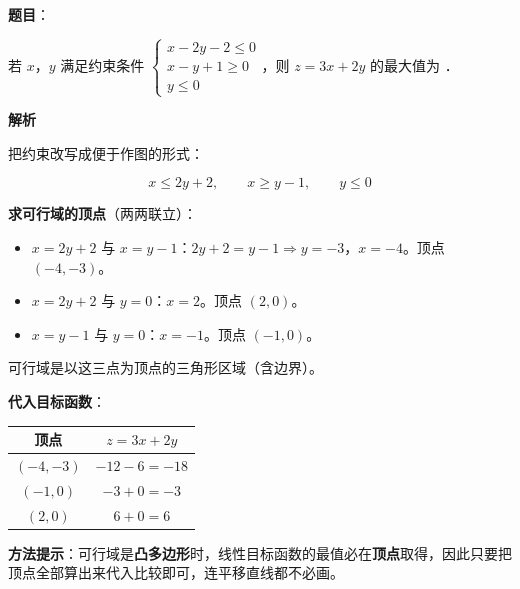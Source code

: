 \begin{answer}

\textbf{题目}：

若 $x$，$y$ 满足约束条件 $\begin{cases}x-2y-2\le0\\ x-y+1\ge0\\ y\le0\end{cases}$，则 $z=3x+2y$ 的最大值为 \gkblank{}．

\textbf{解析}

把约束改写成便于作图的形式：

\nopagebreak[4]
\[x\le2y+2,\qquad x\ge y-1,\qquad y\le0\]

\textbf{求可行域的顶点}（两两联立）：

\begin{itemize}
\item $x=2y+2$ 与 $x=y-1$：$2y+2=y-1\Rightarrow y=-3$，$x=-4$。顶点 $(-4,-3)$。
\item $x=2y+2$ 与 $y=0$：$x=2$。顶点 $(2,0)$。
\item $x=y-1$ 与 $y=0$：$x=-1$。顶点 $(-1,0)$。
\end{itemize}

可行域是以这三点为顶点的三角形区域（含边界）。

\textbf{代入目标函数}：

\begin{center}
\begin{tabular}{cc}
\toprule
顶点 & $z=3x+2y$ \\
\midrule
$(-4,-3)$ & $-12-6=-18$ \\
$(-1,0)$ & $-3+0=-3$ \\
$(2,0)$ & $6+0=\boxed{6}$ \\
\bottomrule
\end{tabular}
\end{center}

\begin{gktip}
\textbf{方法提示}：可行域是\textbf{凸多边形}时，线性目标函数的最值必在\textbf{顶点}取得，因此只要把顶点全部算出来代入比较即可，连平移直线都不必画。
\end{gktip}


\par\medskip

\end{answer}
